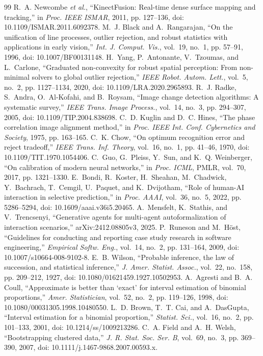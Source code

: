 \documentclass[conference,10pt]{IEEEtran}
\begin{document}
\begin{thebibliography}{99}
 R.~A. Newcombe \emph{et al.}, ``KinectFusion: Real-time dense surface mapping and tracking,'' in \emph{Proc. IEEE ISMAR}, 2011, pp. 127--136, doi: 10.1109/ISMAR.2011.6092378.
 M.~J. Black and A.~Rangarajan, ``On the unification of line processes, outlier rejection, and robust statistics with applications in early vision,'' \emph{Int. J. Comput. Vis.}, vol.~19, no.~1, pp. 57--91, 1996, doi: 10.1007/BF00131148.
 H.~Yang, P.~Antonante, V.~Tzoumas, and L.~Carlone, ``Graduated non-convexity for robust spatial perception: From non-minimal solvers to global outlier rejection,'' \emph{IEEE Robot. Autom. Lett.}, vol.~5, no.~2, pp. 1127--1134, 2020, doi: 10.1109/LRA.2020.2965893.
 R.~J. Radke, S.~Andra, O.~Al-Kofahi, and B.~Roysam, ``Image change detection algorithms: A systematic survey,'' \emph{IEEE Trans. Image Process.}, vol.~14, no.~3, pp. 294--307, 2005, doi: 10.1109/TIP.2004.838698.
 C.~D. Kuglin and D.~C. Hines, ``The phase correlation image alignment method,'' in \emph{Proc. IEEE Int. Conf. Cybernetics and Society}, 1975, pp. 163--165.
 C.~K. Chow, ``On optimum recognition error and reject tradeoff,'' \emph{IEEE Trans. Inf. Theory}, vol.~16, no.~1, pp. 41--46, 1970, doi: 10.1109/TIT.1970.1054406.
 C.~Guo, G.~Pleiss, Y.~Sun, and K.~Q. Weinberger, ``On calibration of modern neural networks,'' in \emph{Proc. ICML}, PMLR, vol.~70, 2017, pp. 1321--1330.
 E.~Bondi, R.~Koster, H.~Sheahan, M.~Chadwick, Y.~Bachrach, T.~Cemgil, U.~Paquet, and K.~Dvijotham, ``Role of human-AI interaction in selective prediction,'' in \emph{Proc. AAAI}, vol.~36, no.~5, 2022, pp. 5286--5294, doi: 10.1609/aaai.v36i5.20465.
 A.~Mensfelt, K.~Stathis, and V.~Trencsenyi, ``Generative agents for multi-agent autoformalization of interaction scenarios,'' arXiv:2412.08805v3, 2025.
 P.~Runeson and M.~H\"ost, ``Guidelines for conducting and reporting case study research in software engineering,'' \emph{Empirical Softw. Eng.}, vol.~14, no.~2, pp. 131--164, 2009, doi: 10.1007/s10664-008-9102-8.
 E.~B. Wilson, ``Probable inference, the law of succession, and statistical inference,'' \emph{J. Amer. Statist. Assoc.}, vol.~22, no.~158, pp. 209--212, 1927, doi: 10.1080/01621459.1927.10502953.
 A.~Agresti and B.~A. Coull, ``Approximate is better than `exact' for interval estimation of binomial proportions,'' \emph{Amer. Statistician}, vol.~52, no.~2, pp. 119--126, 1998, doi: 10.1080/00031305.1998.10480550.
 L.~D. Brown, T.~T. Cai, and A.~DasGupta, ``Interval estimation for a binomial proportion,'' \emph{Statist. Sci.}, vol.~16, no.~2, pp. 101--133, 2001, doi: 10.1214/ss/1009213286.
 C.~A. Field and A.~H. Welsh, ``Bootstrapping clustered data,'' \emph{J. R. Stat. Soc. Ser. B}, vol.~69, no.~3, pp. 369--390, 2007, doi: 10.1111/j.1467-9868.2007.00593.x.
\end{thebibliography}
\end{document}
